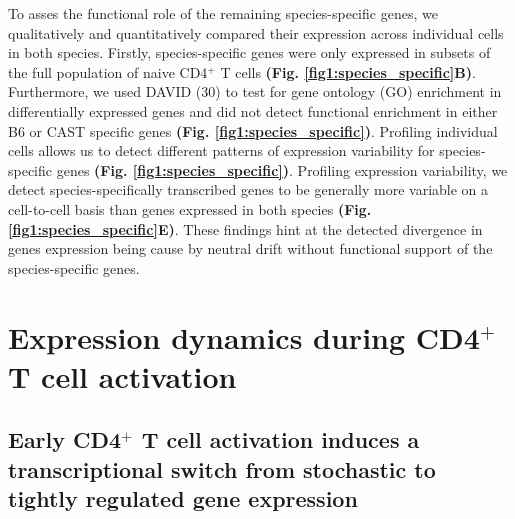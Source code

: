 To asses the functional role of the remaining species-specific genes, we qualitatively and quantitatively compared their expression across individual cells in both species. Firstly, species-specific genes were only expressed in subsets of the full population of naive CD4$^+$ T cells \textbf{(Fig. \ref{fig1:species_specific}B)}. Furthermore, we used DAVID (30) to test for gene ontology (GO) enrichment in differentially expressed genes and did not detect functional enrichment in either B6 or CAST specific genes \textbf{(Fig. \ref{fig1:species_specific})}. Profiling individual cells allows us to detect different patterns of expression variability for species-specific genes \textbf{(Fig. \ref{fig1:species_specific})}. Profiling expression variability, we detect species-specifically transcribed genes to be generally more variable on a cell-to-cell basis than genes expressed in both species \textbf{(Fig. \ref{fig1:species_specific}E)}. These findings hint at the detected divergence in genes expression being cause by neutral drift without functional support of the species-specific genes.

\section{Expression dynamics during CD4$^+$ T cell activation}
\subsection*{Early CD4$^+$ T cell activation induces a transcriptional switch from stochastic to tightly regulated gene expression}

